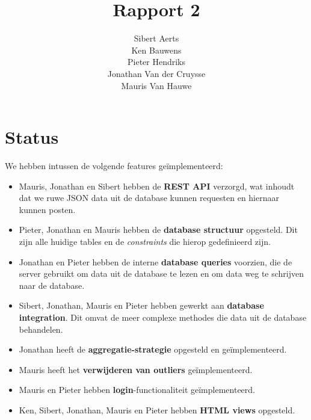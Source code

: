 \documentclass[12pt,draft,parskip=full]{article}
\begin{document}
\title{Rapport 2}
\author{Sibert Aerts \\ Ken Bauwens \\ Pieter Hendriks \\ Jonathan Van der Cruysse \\ Mauris Van Hauwe}
\maketitle

\newcommand{\code}[1]{\texttt{#1}}
%
\newcommand{\CS}{{C\#}}
\lstset{language=[Sharp]C,basicstyle=\ttfamily}

\section{Status}
We hebben intussen de volgende features ge\"implementeerd:

\begin{itemize}
\item Mauris, Jonathan en Sibert hebben de \textbf{REST API} verzorgd, wat
inhoudt dat we ruwe JSON data uit de database kunnen requesten en hiernaar
kunnen posten.

\item Pieter, Jonathan en Mauris hebben de \textbf{database structuur}
opgesteld. Dit zijn alle huidige tables en de \textit{constraints} die hierop gedefinieerd zijn.

\item Jonathan en Pieter hebben de interne \textbf{database queries} voorzien,
die de server gebruikt om data uit de database te lezen en om data weg te
schrijven naar de database.

\item Sibert, Jonathan, Mauris en Pieter hebben gewerkt aan \textbf{database
integration}. Dit omvat de meer complexe methodes die data uit de database
behandelen.

\item Jonathan heeft de \textbf{aggregatie-strategie} opgesteld en ge\"implementeerd.

\item Mauris heeft het \textbf{verwijderen van outliers} ge\"implementeerd.

\item Mauris en Pieter hebben \textbf{login}-functionaliteit ge\"implementeerd.

\item Ken, Sibert, Jonathan, Mauris en Pieter hebben \textbf{HTML views} opgesteld.

\end{itemize}
\end{document}
